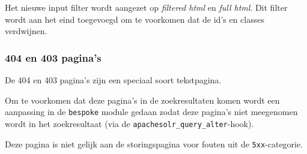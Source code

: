 Het nieuwe input filter wordt aangezet op \emph{filtered html} en \emph{full html}. Dit filter wordt aan het eind toegevoegd om te voorkomen dat de id's en classes verdwijnen.

\subsubsection{404 en 403 pagina's}\label{404pagina}

De 404 en 403 pagina's zijn een speciaal soort tekstpagina.

Om te voorkomen dat deze pagina's in de zoekresultaten komen wordt een aanpassing in de \texttt{bespoke} module gedaan zodat deze pagina's niet meegenomen wordt in het zoekresultaat (via de \texttt{apachesolr\_query\_alter}-hook).

Deze pagina is niet gelijk aan de storingspagina voor fouten uit de \texttt{5xx}-categorie.

